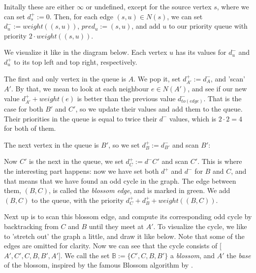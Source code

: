 Initally these are either $\infty$ or undefined, except for the source vertex $s$, where we can set $d^+_s := 0$. Then, for each edge $(s,u) \in N(s)$, we can set $d^-_u := weight((s,u))$, $pred_u := (s,u)$, and add $u$ to our priority queue with priority $2 \cdot weight((s,u))$.

We visualize it like in the diagram below. Each vertex $u$ has its values for $d^-_u$ and $d^+_u$ to its top left and top right, respectively.



The first and only vertex in the queue is $A$. We pop it, set $d^+_{A'} := d^-_A$, and 'scan' $A'$. By that, we mean to look at each neighbour $e \in N(A')$, and see if our new value $d^+_{A'} + weight(e)$ is better than the previous value $d^-_{to(edge)}$. That is the case for both $B'$ and $C'$, so we update their values and add them to the queue. Their priorities in the queue is equal to twice their $d^-$ values, which is $2 \cdot 2 = 4$ for both of them.



The next vertex in the queue is $B'$, so we set $d^+_B := d^-_{B'}$ and scan $B'$:



Now $C'$ is the next in the queue, we set $d^+_C := d^-{C'}$ and scan $C'$. This is where the interesting part happens: now we have set both $d^+$ and $d^-$ for $B$ and $C$, and that means that we have found an odd cycle in the graph. The edge between them, $(B,C)$, is called the \emph{blossom edge}, and is marked in green. We add $(B,C)$ to the queue, with the priority $d^+_C + d^+_B + weight((B,C))$.



Next up is to scan this blossom edge, and compute its corresponding odd cycle by backtracking from $C$ and $B$ until they meet at $A'$. To visualize the cycle, we like to 'stretch out' the graph a little, and draw it like below. Note that some of the edges are omitted for clarity. Now we can see that the cycle consists of [$A',C',C,B,B',A'$]. We call the set $\mathbb{B} := \{C',C,B,B'\}$ a \emph{blossom}, and $A'$ the \emph{base} of the blossom, inspired by the famous Blossom algorithm by \cite{blossom}.



